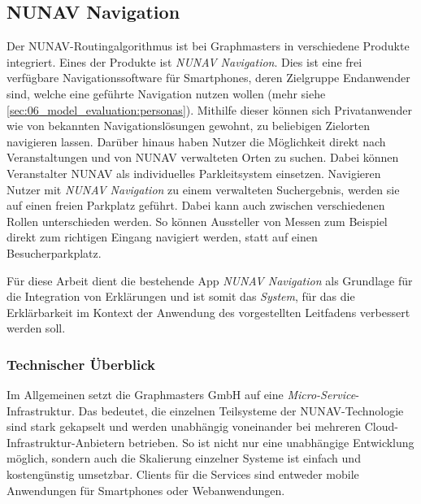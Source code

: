 \subsection{NUNAV Navigation}

Der NUNAV-Routingalgorithmus ist bei Graphmasters in verschiedene Produkte integriert. Eines der Produkte ist \textit{NUNAV Navigation}. Dies ist eine frei verfügbare Navigationssoftware für Smartphones, deren Zielgruppe Endanwender sind, welche eine geführte Navigation nutzen wollen (mehr siehe \autoref{sec:06_model_evaluation:personas}). Mithilfe dieser können sich Privatanwender wie von bekannten Navigationslösungen gewohnt, zu beliebigen Zielorten navigieren lassen. Darüber hinaus haben Nutzer die Möglichkeit direkt nach Veranstaltungen und von NUNAV verwalteten Orten zu suchen. Dabei können Veranstalter NUNAV als individuelles Parkleitsystem einsetzen. Navigieren Nutzer mit \textit{NUNAV Navigation} zu einem verwalteten Suchergebnis, werden sie auf einen freien Parkplatz geführt. Dabei kann auch zwischen verschiedenen Rollen unterschieden werden. So können Aussteller von Messen zum Beispiel direkt zum richtigen Eingang navigiert werden, statt auf einen Besucherparkplatz.

Für diese Arbeit dient die bestehende App \textit{NUNAV Navigation} als Grundlage für die Integration von Erklärungen und ist somit das \textit{System}, für das die Erklärbarkeit im Kontext der Anwendung des vorgestellten Leitfadens verbessert werden soll.

\subsubsection{Technischer Überblick}

Im Allgemeinen setzt die Graphmasters GmbH auf eine \textit{Micro-Service}-Infrastruktur. Das bedeutet, die einzelnen Teilsysteme der NUNAV-Technologie sind stark gekapselt und werden unabhängig voneinander bei mehreren Cloud-Infrastruktur-Anbietern betrieben. So ist nicht nur eine unabhängige Entwicklung möglich, sondern auch die Skalierung einzelner Systeme ist einfach und kostengünstig umsetzbar. Clients für die Services sind entweder mobile Anwendungen für Smartphones oder Webanwendungen.


